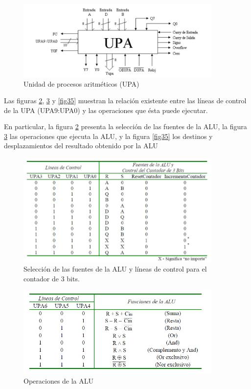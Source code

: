 \documentclass[12pt]{book}
\theoremstyle{definition}
\theoremstyle{remark}
\theoremstyle{plain}
\begin{document}
\begin{figure}
\centering
\includegraphics[width=4in]{ALU2.jpg}
\caption{Unidad de procesos aritméticos (UPA)}
\label{fig32}
\end{figure}

Las figuras \ref{fig33}, \ref{fig34} y \ref{fig35} muestran la relación existente entre las líneas de control de la UPA
(UPA9:UPA0) y las operaciones que ésta puede ejecutar.

En particular, la figura \ref{fig33} presenta la selección de las fuentes de la ALU, la figura \ref{fig34} las
operaciones que ejecuta la ALU, y la figura \ref{fig35} los destinos y desplazamientos del resultado
obtenido por la ALU


\begin{figure}
\centering
\includegraphics[width=4in]{tabla1.jpg}
\caption{Selección de las fuentes de la ALU y líneas de control para el contador de 3 bits.}
\label{fig33}
\end{figure}


\begin{figure}
\centering
\includegraphics[width=4in]{tabla2.jpg}
\caption{Operaciones de la ALU}
\label{fig34}
\end{figure}
\end{document}
